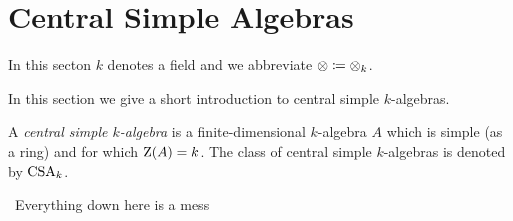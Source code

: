 \section{Central Simple Algebras}


\begin{conventions}
  In this secton $k$ denotes a field and we abbreviate $\otimes \coloneqq \otimes_k$.
\end{conventions}


\begin{fluff}
  In this section we give a short introduction to central simple $k$-algebras.
\end{fluff}


\begin{definition}
  A \emph{central simple $k$-algebra} is a finite-dimensional $k$-algebra $A$ which is simple (as a ring) and for which $\operatorname{Z}(A) = k$.
  The class of central simple $k$-algebras is denoted by $\operatorname{CSA}_k$.
\end{definition}













\noindent\hrulefill\, Everything down here is a mess \,\hrulefill




